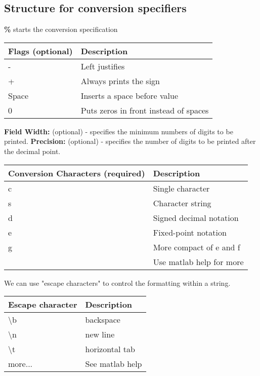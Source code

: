 \documentclass[12pt]{article}
\begin{document}
\subsection{Structure for conversion specifiers}
\textbf{\%} starts the conversion specification
\vskip 0.07in \noindent
\begin{tabular}{|l|l|}
	\hline
	Flags (optional) & Description\\ \hline
	- & Left justifies\\
	+ & Always prints the sign\\
	Space & Inserts a space before value\\
	0 & Puts zeros in front instead of spaces\\ \hline

\end{tabular}
\vskip 0.07in \noindent
	\textbf{Field Width:} (optional) - specifies the minimum numbers of digits to be printed.
\newline	\textbf{Precision:} (optional) - specifies the number of digits to be printed after  the decimal point.
\vskip 0.07in \noindent
\begin{tabular}{|l|l|}
	\hline
	Conversion Characters (required) & Description\\ \hline
	c & Single character\\
	s & Character string\\
	d & Signed decimal notation\\
	e & Fixed-point notation\\
	g & More compact of e and f\\
	  & Use matlab help for more\\
	  \hline
\end{tabular}
\vskip 0.07in \noindent
We can use "escape characters" to control the formatting within a string.
\newline
\begin{tabular}{|l|l|}
	\hline
	Escape character & Description\\ \hline
	\textbackslash b & backspace\\
	\textbackslash n & new line\\
	\textbackslash t & horizontal tab\\
	more... & See matlab help\\ \hline

\end{tabular}
\end{document}
